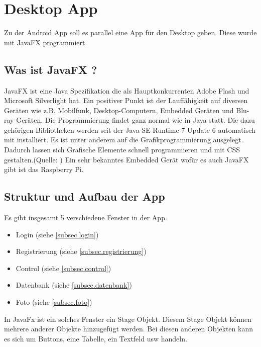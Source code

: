 
\chapter{Desktop App}
Zu der Android App soll es parallel eine App für den Desktop geben. Diese wurde mit JavaFX programmiert.

				
				
\section{Was ist JavaFX ?}
JavaFX ist eine Java Spezifikation die als Hauptkonkurrenten Adobe Flash und Microsoft Silverlight hat. Ein positiver Punkt ist der Lauffähigkeit auf diversen Geräten wie z.B. Mobilfunk, Desktop-Computern, Embedded Geräten und Blu-ray Geräten. Die Programmierung findet ganz normal wie in Java statt. Die dazu gehörigen Bibliotheken werden seit der Java SE Runtime 7 Update 6 automatisch mit installiert. Es ist unter anderem auf die Grafikprogrammierung ausgelegt. Dadurch lassen sich Grafische Elemente schnell programmieren und mit CSS gestalten.(Quelle: \cite{bib.jFXRaspPi})
Ein sehr bekanntes Embedded Gerät wofür es auch JavaFX gibt ist das Raspberry Pi.

\section{Struktur und Aufbau der App}
Es gibt insgesamt 5 verschiedene Fenster in der App.
\begin{itemize}
	\item Login (siehe \ref{subsec.login})
	\item Registrierung (siehe \ref{subsec.registrierung})
	\item Control (siehe \ref{subsec.control})
	\item Datenbank (siehe \ref{subsec.datenbank})
	\item Foto (siehe \ref{subsec.foto})
\end{itemize}

In JavaFx ist ein solches Fenster ein Stage Objekt. Diesem Stage Objekt können mehrere anderer Objekte hinzugefügt werden. Bei diesen anderen Objekten kann es sich um Buttons, eine Tabelle, ein Textfeld usw handeln.

